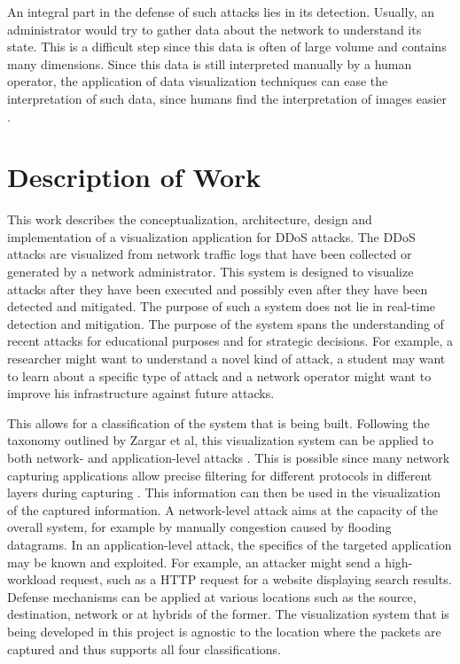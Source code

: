 An integral part in the defense of such attacks lies in its detection. Usually, an administrator would try to gather data about the network to understand its state. This is a difficult step since this data is often of large volume and contains many dimensions.
Since this data is still interpreted manually by a human operator, the application of data visualization techniques can ease the interpretation of such data, since humans find the interpretation of images easier \cite{wu}.

\section{Description of Work}
This work describes the conceptualization, architecture, design and implementation of a visualization application for DDoS attacks.
The DDoS attacks are visualized from network traffic logs that have been collected or generated by a network administrator. This system is designed to visualize attacks after they have been executed and possibly even after they have been detected and mitigated. The purpose of such a system does not lie in real-time detection and mitigation. The purpose of the system spans the understanding of recent attacks for educational purposes and for strategic decisions. For example, a researcher might want to understand a novel kind of attack, a student may want to learn about a specific type of attack and a network operator might want to improve his infrastructure against future attacks.

This allows for a classification of the system that is being built. Following the taxonomy outlined by Zargar et al, this visualization system can be applied to both network- and application-level attacks \cite{zargar}. This is possible since many network capturing applications allow precise filtering for different protocols in different layers during capturing \cite{tcpdump}. This information can then be used in the visualization of the captured information.
A network-level attack aims at the capacity of the overall system, for example by manually congestion caused by flooding datagrams. In an application-level attack, the specifics of the targeted application may be known and exploited. For example, an attacker might send a high-workload request, such as a HTTP request for a website displaying search results.
Defense mechanisms can be applied at various locations such as the source, destination, network or at hybrids of the former.
The visualization system that is being developed in this project is agnostic to the location where the packets are captured and thus supports all four classifications.

